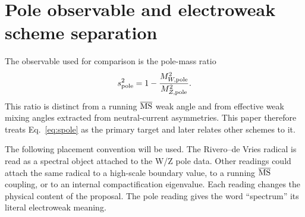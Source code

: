 \section{Pole observable and electroweak scheme separation}
\label{sec:pole}

The observable used for comparison is the pole-mass ratio
\begin{equation}
  s^2_{\rm pole} = 1-\frac{M_{W,\rm pole}^2}{M_{Z,\rm pole}^2}.
  \label{eq:spole}
\end{equation}
This ratio is distinct from a running \(\overline{\mathrm{MS}}\) weak angle and from effective weak mixing angles extracted from neutral-current asymmetries.  This paper therefore treats Eq.~\eqref{eq:spole} as the primary target and later relates other schemes to it.

The following placement convention will be used.  The Rivero--de Vries radical is read as a spectral object attached to the W/Z pole data.  Other readings could attach the same radical to a high-scale boundary value, to a running \(\overline{\mathrm{MS}}\) coupling, or to an internal compactification eigenvalue.  Each reading changes the physical content of the proposal.  The pole reading gives the word ``spectrum'' its literal electroweak meaning.

